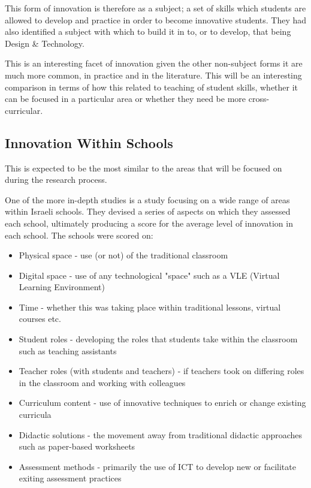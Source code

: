 This form of innovation is therefore as a subject; a set of skills which students are allowed to develop and practice in order to become innovative students. They had also identified a subject with which to build it in to, or to develop, that being Design \& Technology.

This is an interesting facet of innovation given the other non-subject forms it are much more common, in practice and in the literature. This will be an interesting comparison in terms of how this related to teaching of student skills, whether it can be focused in a particular area or whether they need be more cross-curricular.

\subsection{Innovation Within Schools}
This is expected to be the most similar to the areas that will be focused on during the research process.

One of the more in-depth studies is a study focusing on a wide range of areas within Israeli schools. \cite{tubin2003domains} They devised a series of aspects on which they assessed each school, ultimately producing a score for the average level of innovation in each school. The schools were scored on:

\begin{itemize}
\item Physical space - use (or not) of the traditional classroom
\item Digital space - use of any technological "space" such as a VLE (Virtual Learning Environment)
\item Time - whether this was taking place within traditional lessons, virtual courses etc.
\item Student roles - developing the roles that students take within the classroom such as teaching assistants
\item Teacher roles (with students and teachers) - if teachers took on differing roles in the classroom and working with colleagues
\item Curriculum content - use of innovative techniques to enrich or change existing curricula
\item Didactic solutions - the movement away from traditional didactic approaches such as paper-based worksheets
\item Assessment methods - primarily the use of ICT to develop new or facilitate exiting assessment practices
\end{itemize}

